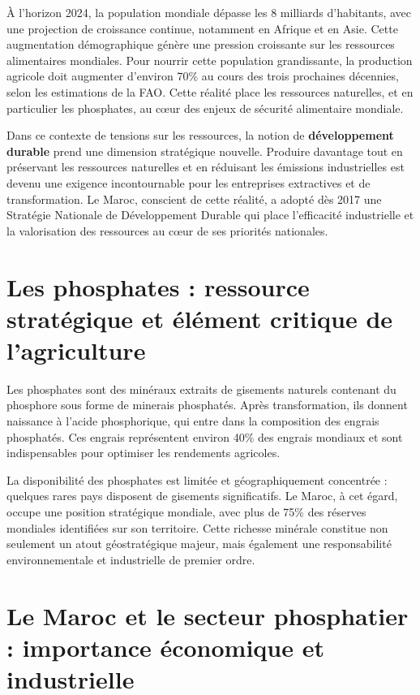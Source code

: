 \documentclass[a4paper,12pt]{report}
\begin{document}
À l'horizon 2024, la population mondiale dépasse les 8 milliards d'habitants, avec une projection de croissance continue, notamment en Afrique et en Asie. Cette augmentation démographique génère une pression croissante sur les ressources alimentaires mondiales. Pour nourrir cette population grandissante, la production agricole doit augmenter d'environ 70\% au cours des trois prochaines décennies, selon les estimations de la FAO. Cette réalité place les ressources naturelles, et en particulier les phosphates, au cœur des enjeux de sécurité alimentaire mondiale.

Dans ce contexte de tensions sur les ressources, la notion de \textbf{développement durable} prend une dimension stratégique nouvelle. Produire davantage tout en préservant les ressources naturelles et en réduisant les émissions industrielles est devenu une exigence incontournable pour les entreprises extractives et de transformation. Le Maroc, conscient de cette réalité, a adopté dès 2017 une Stratégie Nationale de Développement Durable qui place l'efficacité industrielle et la valorisation des ressources au cœur de ses priorités nationales.

\section*{Les phosphates : ressource stratégique et élément critique de l'agriculture}

Les phosphates sont des minéraux extraits de gisements naturels contenant du phosphore sous forme de minerais phosphatés. Après transformation, ils donnent naissance à l'acide phosphorique, qui entre dans la composition des engrais phosphatés. Ces engrais représentent environ 40\% des engrais mondiaux et sont indispensables pour optimiser les rendements agricoles.

La disponibilité des phosphates est limitée et géographiquement concentrée : quelques rares pays disposent de gisements significatifs. Le Maroc, à cet égard, occupe une position stratégique mondiale, avec plus de 75\% des réserves mondiales identifiées sur son territoire. Cette richesse minérale constitue non seulement un atout géostratégique majeur, mais également une responsabilité environnementale et industrielle de premier ordre.

\section*{Le Maroc et le secteur phosphatier : importance économique et industrielle}
\end{document}
